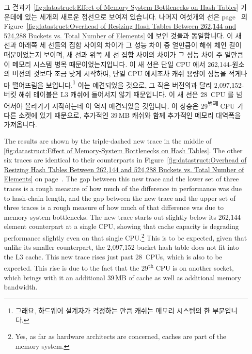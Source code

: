 {	그 결과가
	\cref{fig:datastruct:Effect of Memory-System Bottlenecks on Hash Tables}
	가운데에 있는 세개의 새로운 점선으로 보여져 있습니다.
	나머지 여섯개의 선은
	page~\pageref{fig:datastruct:Overhead of Resizing Hash Tables Between 262,144 and 524,288 Buckets vs. Total Number of Elements} 의
	Figure~\ref{fig:datastruct:Overhead of Resizing Hash Tables Between 262,144 and 524,288 Buckets vs. Total Number of Elements}
	에 보인 것들과 동일합니다.
	이 새 선과 아래쪽 세 선들의 집합 사이의 차이가 그 성능 차이 중 얼만큼이
	해쉬 체인 길이 때문이었는지 보이며, 새 선과 위쪽 세 선 집합 사이의
	차이가 그 성능 차이 주 얼만큼이 메모리 시스템 병목 때문이었는지입니다.
	이 새 선은 단일 CPU 에서 262,144-원소의 버전의 것보다 조금 낮게
	시작하여, 단일 CPU 에서조차 캐쉬 용량이 성능을 적게나마 떨어뜨림을
	보입니다.\footnote{
		그래요, 하드웨어 설계자가 걱정하는 만큼 캐쉬는 메모리 시스템의
		한 부분입니다.}
	이는 예견되었을 것으로, 그 작은 버전의과 달리 2,097,152-버킷 해쉬
	테이블은 L3 캐쉬에 들어서지 않기 때문입니다.
	이 새 선은 28~CPU 를 넘어서야 올라가기 시작하는데 이 역시 예견되었을
	것입니다.
	이 상승은 29\textsuperscript{번째} CPU 가 다른 소켓에 있기 때문으로,
	추가적인 39\,MB 캐쉬와 함께 추가적인 메모리 대역폭을 가져옵니다.

	\iffalse

	The results are shown by the triple-dashed new trace in
	the middle of
	\cref{fig:datastruct:Effect of Memory-System Bottlenecks on Hash Tables}.
	The other six traces are identical to their counterparts in
	Figure~\ref{fig:datastruct:Overhead of Resizing Hash Tables Between 262,144 and 524,288 Buckets vs. Total Number of Elements}
	on page~\pageref{fig:datastruct:Overhead of Resizing Hash Tables Between 262,144 and 524,288 Buckets vs. Total Number of Elements}.
	The gap between this new trace and the lower set of three
	traces is a rough measure of how much of the difference in
	performance was due to hash-chain length, and the gap between
	the new trace and the upper set of three traces is a rough measure
	of how much of that difference was due to memory-system bottlenecks.
	The new trace starts out slightly below its 262,144-element
	counterpart at a single CPU, showing that cache capacity is
	degrading performance slightly even on that single CPU\@.\footnote{
		Yes, as far as hardware architects are concerned,
		caches are part of the memory system.}
	This is to be expected, given that unlike its smaller counterpart,
	the 2,097,152-bucket hash table does not fit into the L3 cache.
	This new trace rises just past 28~CPUs, which is also to be
	expected.
	This rise is due to the fact that the 29\textsuperscript{th}
	CPU is on another socket, which brings with it an additional
	39\,MB of cache as well as additional memory bandwidth.

}
